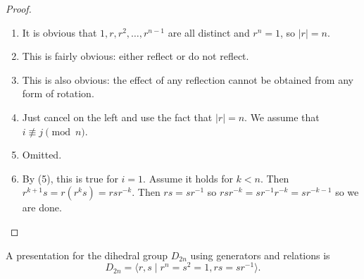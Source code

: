 \begin{example}
\begin{proof} \
\begin{enumerate}[label=(\roman*)]
\item It is obvious that $1,r,r^2,\dots,r^{n-1}$ are all distinct and $r^n=1$, so $|r|=n$.
\item This is fairly obvious: either reflect or do not reflect.
\item This is also obvious: the effect of any reflection cannot be obtained from any form of rotation.
\item Just cancel on the left and use the fact that $|r|=n$. We assume that $i\not\equiv j\pmod n$.
\item Omitted.
\item By (5), this is true for $i=1$. Assume it holds for $k<n$. Then $r^{k+1}s=r(r^ks)=rsr^{-k}$. Then $rs=sr^{-1}$ so $rsr^{-k}=sr^{-1}r^{-k}=sr^{-k-1}$ so we are done.
\end{enumerate}
\end{proof}

A presentation for the dihedral group $D_{2n}$ using generators and relations is
\[D_{2n}=\langle r,s\mid r^n=s^2=1,rs=sr^{-1}\rangle.\]
\end{example}

